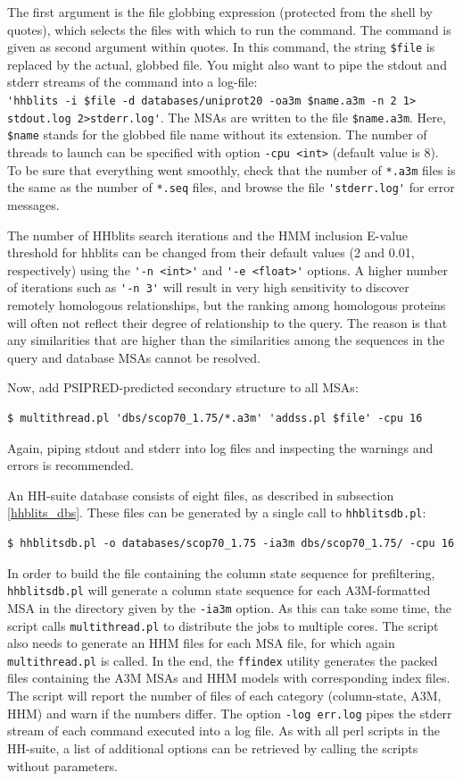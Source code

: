 \documentclass[11pt,a4paper]{article}
\begin{document}
The first argument is the file globbing expression (protected from the shell by quotes), which selects the files with which to run the command. The command is given as second argument within quotes. In this command, the string \verb`$file` is replaced by the actual, globbed file. You might also want to pipe the stdout and stderr streams of the command into a log-file:\\
{\small \verb`'hhblits -i $file -d databases/uniprot20 -oa3m $name.a3m -n 2 1> stdout.log 2>stderr.log'`}. 
The MSAs are written to the file \verb`$name.a3m`. Here, \verb`$name` stands for the globbed file name without its extension. The number of threads to launch can be specified with option \verb`-cpu <int>` (default value is 8). To be sure that everything went smoothly, check that the number of \verb`*.a3m` files is the same as the number of \verb`*.seq` files, and browse the file \verb`'stderr.log'` for error messages. 

The number of HHblits search iterations and the HMM inclusion E-value threshold for hhblits can be changed from their default values (2 and 0.01, respectively) using the \verb`'-n <int>'` and \verb`'-e <float>'` options. A higher number of iterations such as  \verb`'-n 3'` will result in very high sensitivity to discover remotely homologous relationships, but the ranking among homologous proteins will often not reflect their degree of relationship to the query. The reason is that any similarities that are higher than the similarities among the sequences in the query and database MSAs cannot be resolved. 

Now, add PSIPRED-predicted secondary structure to all MSAs:
\begin{verbatim}
$ multithread.pl 'dbs/scop70_1.75/*.a3m' 'addss.pl $file' -cpu 16 
\end{verbatim}
Again, piping stdout and stderr into log files and inspecting the warnings and errors is recommended. 

An HH-suite database consists of eight files, as described in subsection \ref{hhblits_dbs}. These files can be generated by a single call to \verb`hhblitsdb.pl`:
\begin{verbatim}
$ hhblitsdb.pl -o databases/scop70_1.75 -ia3m dbs/scop70_1.75/ -cpu 16
\end{verbatim}
In order to build the file containing the column state sequence for prefiltering, \verb`hhblitsdb.pl` will generate a column state sequence for each A3M-formatted MSA in the directory given by the \verb`-ia3m` option. As this can take some time, the script calls \verb`multithread.pl` to distribute the jobs to multiple cores. The script also needs to generate an HHM files for each MSA file, for which again \verb`multithread.pl` is called. In the end, the \verb`ffindex` utility generates the packed files containing the A3M MSAs and HHM models with corresponding index files. The script will report the number of files of each category (column-state, A3M, HHM) and warn if the numbers differ. The option \verb`-log err.log` pipes the stderr stream of each command executed into a log file. As with all perl scripts in the HH-suite, a list of additional options can be retrieved by calling the scripts without parameters.
\end{document}
